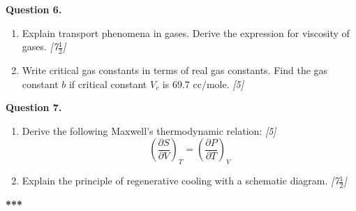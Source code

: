 \documentclass[11pt,a4paper]{article}
\newcommand{\pts}[1]{\hfill \textit{[#1]}}
\begin{document}
\bigskip

\noindent \textbf{Question 6.}
\begin{enumerate}[label=(\alph*)]
  \item Explain transport phenomena in gases. Derive the expression for viscosity of gases. \pts{7$\frac{1}{2}$}
  \item Write critical gas constants in terms of real gas constants. Find the gas constant $b$ if critical constant $V_c$ is $69.7\text{ cc/mole}$. \pts{5}
\end{enumerate}

\bigskip

\noindent \textbf{Question 7.}
\begin{enumerate}[label=(\alph*)]
  \item Derive the following Maxwell's thermodynamic relation: \pts{5}
  \[ \left(\frac{\partial S}{\partial V}\right)_T = \left(\frac{\partial P}{\partial T}\right)_V \]
  \item Explain the principle of regenerative cooling with a schematic diagram. \pts{7$\frac{1}{2}$}
\end{enumerate}

\bigskip
\begin{center}
  \textbf{***}
\end{center}
\end{document}
